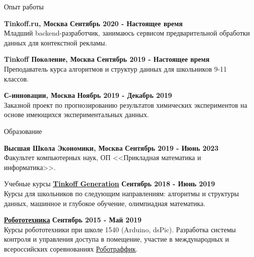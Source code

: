 \documentclass{resume} %
\begin{document}
\begin{rSection}{Опыт работы}

{\bf Tinkoff.ru, Москва} \hfill {\bf Сентябрь 2020 - Настоящее время} \\ 
Младший backend-разработчик, занимаюсь сервисом предварительной обработки данных для контекстной рекламы.

{\bf Tinkoff Поколение, Москва} \hfill {\bf Сентябрь 2019 - Настоящее время} \\ 
Преподаватель курса алгоритмов и структур данных для школьников 9-11 классов.

{\bf С-инновации, Москва} \hfill {\bf Ноябрь 2019 - Декабрь 2019} \\ 
Заказной проект по прогнозированию результатов химических экспериментов на основе имеющихся экспериментальных данных.
\end{rSection}

\begin{rSection}{Образование}

{\bf Высшая Школа Экономики, Москва} \hfill {\bf Сентябрь 2019 - Июнь 2023} \\ 
Факультет компьютерных наук, ОП <<Прикладная математика и информатика>>.

\end{rSection}

\begin{rSection}{Учебные курсы}
{\bf \href{http://github.com/kik0s/tink}{\underline{Tinkoff Generation}}} \hfill {\bf Сентябрь 2018 - Июнь 2019} \\
Курсы для школьников по следующим направлениям: алгоритмы и структуры данных, машинное и глубокое обучение, олимпиадная математика.

{\bf \href{http://github.com/it-church/rbtrf-2018}{\underline{Робототехника}}} \hfill {\bf Сентябрь 2015 - Май 2019} \\
Курсы робототехники при школе 1540 (Arduino, dsPic). Разработка системы контроля и управления доступа в помещение, участие в международных и всероссийских соревнованиях
\href{https://wroboto.ru/rules/robotraffic/}{\underline{Роботраффик}}.


\end{rSection}
\end{document}
